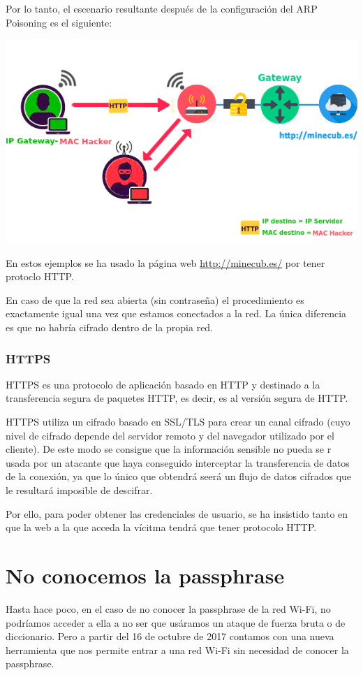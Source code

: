 Por lo tanto, el escenario resultante después de la configuración del ARP Poisoning es el siguiente:
\begin{center}
	\includegraphics[scale=0.7]{Escenario.png}
\end{center}

\Nota En estos ejemplos se ha usado la página web \url{http://minecub.es/} por tener protoclo HTTP.

\Nota En caso de que la red sea abierta (sin contraseña) el procedimiento es exactamente igual una vez que estamos conectados a la red. La única diferencia es que no habría cifrado dentro de la propia red.

\subsubsection{HTTPS}
HTTPS es una protocolo de aplicación basado en HTTP y destinado a la transferencia segura de paquetes HTTP, es decir, es al versión segura de HTTP.

HTTPS utiliza un cifrado basado en SSL/TLS para crear un canal cifrado (cuyo nivel de cifrado depende del servidor remoto y del navegador utilizado por el cliente). De este modo se consigue que la información sensible no pueda se r usada por un atacante que haya conseguido interceptar la transferencia de datos de la conexión, ya que lo único que obtendrá seerá un flujo de datos cifrados que le resultará imposible de descifrar.

Por ello, para poder obtener las credenciales de usuario, se ha insistido tanto en que la web a la que acceda la vícitma tendrá que tener protocolo HTTP.

\section{No conocemos la passphrase}
Hasta hace poco, en el caso de no conocer la passphrase de la red Wi-Fi, no podríamos acceder a ella a no ser que usáramos un ataque de fuerza bruta o de diccionario. Pero a partir del 16 de octubre de 2017 contamos con una nueva herramienta que nos permite entrar a una red Wi-Fi sin necesidad de conocer la passphrase.

